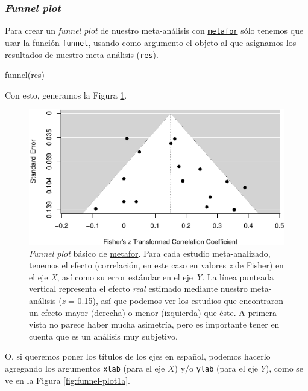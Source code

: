 \documentclass[
  bookmarksnumbered]{article}
\newenvironment{Shaded}{\begin{snugshade}}{\end{snugshade}}
\newcommand{\FunctionTok}[1]{\textcolor[rgb]{0.39,0.29,0.61}{#1}}
\newcommand{\NormalTok}[1]{\textcolor[rgb]{0.12,0.11,0.11}{#1}}
\begin{document}
\hypertarget{funnel-plot}{%
\subsubsection{\texorpdfstring{\emph{Funnel plot}}{Funnel plot}}\label{funnel-plot}}

Para crear un \emph{funnel plot} de nuestro meta-análisis con \href{https://www.metafor-project.org/doku.php}{\texttt{metafor}} sólo tenemos que usar la función \texttt{funnel}, usando como argumento el objeto al que asignamos los resultados de nuestro meta-análisis (\texttt{res}).

\begin{Shaded}
\begin{Highlighting}[]
\FunctionTok{funnel}\NormalTok{(res)}
\end{Highlighting}
\end{Shaded}

Con esto, generamos la Figura \ref{fig:funnel-plot1}.

\begin{figure}
\centering
\includegraphics{Meta-analysis_files/figure-latex/funnel-plot1-1.pdf}
\caption{\label{fig:funnel-plot1}\emph{Funnel plot} básico de \href{https://www.metafor-project.org/doku.php}{metafor}. Para cada estudio meta-analizado, tenemos el efecto (correlación, en este caso en valores \emph{z} de Fisher) en el eje \emph{X}, así como su error estándar en el eje \emph{Y}. La línea punteada vertical representa el efecto \emph{real} estimado mediante nuestro meta-análisis (\emph{z} = 0.15), así que podemos ver los estudios que encontraron un efecto mayor (derecha) o menor (izquierda) que éste. A primera vista no parece haber mucha asimetría, pero es importante tener en cuenta que es un análisis muy subjetivo.}
\end{figure}

O, si queremos poner los títulos de los ejes en español, podemos hacerlo agregando los argumentos \texttt{xlab} (para el eje \(X\)) y/o \texttt{ylab} (para el eje \(Y\)), como se ve en la Figura \ref{fig:funnel-plot1a}.
\end{document}
